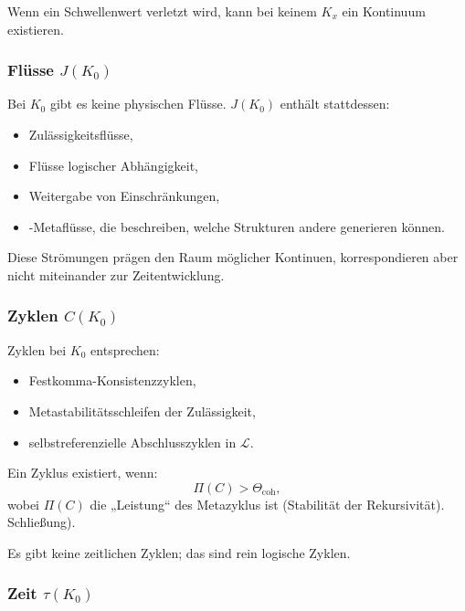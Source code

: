 Wenn ein Schwellenwert verletzt wird, kann bei keinem $K_x$ ein Kontinuum existieren.

\subsubsection{Flüsse \texorpdfstring{$J(K_0)$}{J(K_0)}}

Bei $K_0$ gibt es keine physischen Flüsse.
$J(K_0)$ enthält stattdessen:
\begin{itemize}
    \item Zulässigkeitsflüsse,
    \item Flüsse logischer Abhängigkeit,
    \item Weitergabe von Einschränkungen,
    \item-Metaflüsse, die beschreiben, welche Strukturen andere generieren können.
\end{itemize}

Diese Strömungen prägen den Raum möglicher Kontinuen, korrespondieren aber nicht miteinander
zur Zeitentwicklung.

\subsubsection{Zyklen \texorpdfstring{$C(K_0)$}{C(K_0)}}

Zyklen bei $K_0$ entsprechen:
\begin{itemize}
    \item Festkomma-Konsistenzzyklen,
    \item Metastabilitätsschleifen der Zulässigkeit,
    \item selbstreferenzielle Abschlusszyklen in $\mathcal{L}$.
\end{itemize}

Ein Zyklus existiert, wenn:
\[
\Pi(C) > \Theta_{\mathrm{coh}},
\]
wobei $\Pi(C)$ die „Leistung“ des Metazyklus ist (Stabilität der Rekursivität).
Schließung).

Es gibt keine zeitlichen Zyklen; das sind rein logische Zyklen.

\subsubsection{Zeit \texorpdfstring{$\tau(K_0)$}{\tau(K_0)}}

